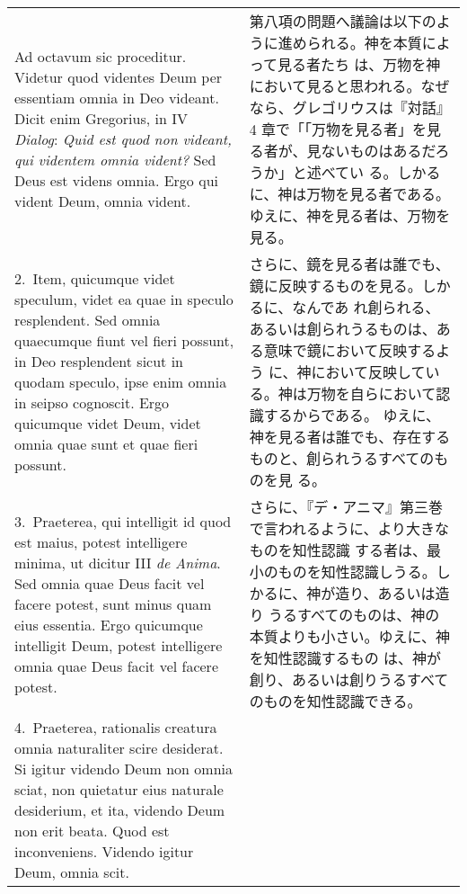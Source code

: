 \documentclass[10pt]{jsarticle} %
\begin{document}
\begin{longtable}{p{21em}p{21em}}

{\sc Ad octavum sic proceditur}. Videtur quod videntes Deum per
essentiam omnia in Deo videant. Dicit enim Gregorius, in IV {\it
Dialog}: {\it Quid est quod non videant, qui videntem omnia vident?}
Sed Deus est videns omnia. Ergo qui vident Deum, omnia vident.

&

第八項の問題へ議論は以下のように進められる。神を本質によって見る者たち
は、万物を神において見ると思われる。なぜなら、グレゴリウスは『対話』4
章で「「万物を見る者」を見る者が、見ないものはあるだろうか」と述べてい
る。しかるに、神は万物を見る者である。ゆえに、神を見る者は、万物を見る。

\\


2.~{\sc Item}, quicumque videt speculum, videt ea quae in speculo
resplendent. Sed omnia quaecumque fiunt vel fieri possunt, in Deo
resplendent sicut in quodam speculo, ipse enim omnia in seipso
cognoscit. Ergo quicumque videt Deum, videt omnia quae sunt et quae
fieri possunt.

&

さらに、鏡を見る者は誰でも、鏡に反映するものを見る。しかるに、なんであ
れ創られる、あるいは創られうるものは、ある意味で鏡において反映するよう
に、神において反映している。神は万物を自らにおいて認識するからである。
ゆえに、神を見る者は誰でも、存在するものと、創られうるすべてのものを見
る。

\\


3.~{\sc Praeterea}, qui intelligit id quod est maius, potest
intelligere minima, ut dicitur III {\it de Anima}. Sed omnia quae Deus
facit vel facere potest, sunt minus quam eius essentia. Ergo quicumque
intelligit Deum, potest intelligere omnia quae Deus facit vel facere
potest.

&

さらに、『デ・アニマ』第三巻で言われるように、より大きなものを知性認識
する者は、最小のものを知性認識しうる。しかるに、神が造り、あるいは造り
うるすべてのものは、神の本質よりも小さい。ゆえに、神を知性認識するもの
は、神が創り、あるいは創りうるすべてのものを知性認識できる。

\\


4.~{\sc Praeterea}, rationalis creatura omnia naturaliter scire
desiderat. Si igitur videndo Deum non omnia sciat, non quietatur eius
naturale desiderium, et ita, videndo Deum non erit beata. Quod est
inconveniens. Videndo igitur Deum, omnia scit.


\end{longtable}
\end{document}

